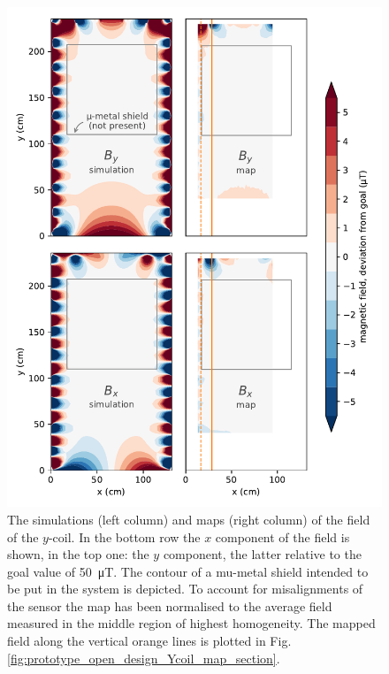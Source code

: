 
\begin{figure}
  \centering
  \includegraphics[width=\linewidth]{gfx/prototype/open_planar_map_comparison.pdf}
  \caption{The simulations (left column) and maps (right column) of the field of the $y$-coil. In the bottom row the $x$ component of the field is shown, in the top one: the $y$ component, the latter relative to the goal value of \SI{50}{\micro\tesla}. The contour of a mu-metal shield intended to be put in the system is depicted. To account for misalignments of the sensor the map has been normalised to the average field measured in the middle region of highest homogeneity. The mapped field along the vertical orange lines is plotted in Fig.\,\ref{fig:prototype_open_design_Ycoil_map_section}.}\label{fig:prototype_open_design_Ycoil_maps}
\end{figure}

